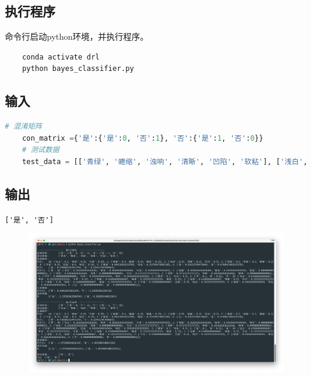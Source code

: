 \documentclass{article}
\begin{document}
\subsection{执行程序}
命令行启动python环境，并执行程序。
\begin{lstlisting}
    conda activate drl
    python bayes_classifier.py
\end{lstlisting}
\subsection{输入}
\begin{lstlisting}[language=Python]
    # 混淆矩阵
    con_matrix ={'是':{'是':0, '否':1}, '否':{'是':1, '否':0}}
    # 测试数据
    test_data = [['青绿', '蜷缩', '浊响', '清晰', '凹陷', '软粘'], ['浅白', '稍蜷', '浊响', '稍糊', '凹陷', '硬滑']]
\end{lstlisting}
\subsection{输出}
\verb|['是', '否']|
\begin{figure}[H]
    \centering
    \includegraphics[width=\textwidth]{bayes_exec_res.png}
\end{figure}
\end{document}
